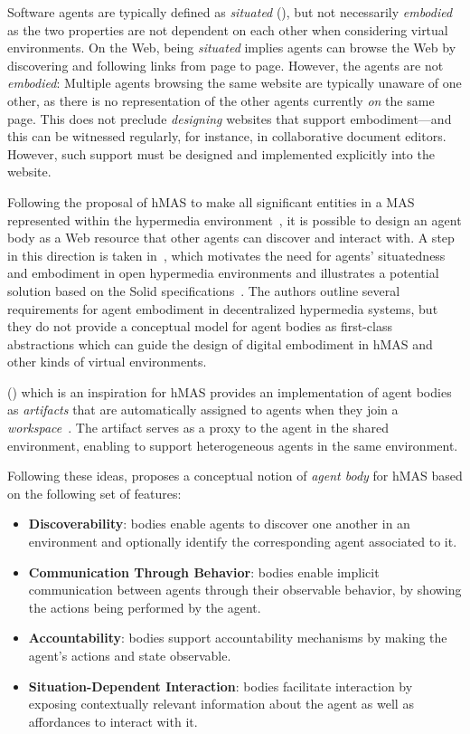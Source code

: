 Software agents are typically defined as \emph{situated} (), but not necessarily \emph{embodied} as the two properties are not dependent on each other when considering virtual environments.
%
On the Web, being \emph{situated} implies agents can browse the Web by discovering and following links from page to page. However, the agents are not \emph{embodied}: Multiple agents browsing the same website are typically unaware of one other, as there is no representation of the other agents currently \emph{on} the same page.
%
This does not preclude \textit{designing} websites that support embodiment---and this can be witnessed regularly, for instance, in collaborative document editors. However, such support must be designed and implemented explicitly into the website.

Following the proposal of \ac{hMAS} to make all significant entities in a \ac{MAS} represented within the hypermedia environment~\cite{Ciortea_Boissier_Ricci_2019}, it is possible to design an agent body as a Web resource that other agents can discover and interact with. 
%
A step in this direction is taken in~\cite{Zimmermann2023}, which motivates the need for agents' situatedness and embodiment in open hypermedia environments and illustrates a potential solution based on the Solid specifications~\cite{Solid_0.9.0:21}. The authors outline several requirements for agent embodiment in decentralized hypermedia systems, but they do not provide a conceptual model for agent bodies as first-class abstractions which can guide the design of digital embodiment in \ac{hMAS} and other kinds of virtual environments.

\cartago{} () which is an inspiration for \ac{hMAS} provides an implementation of agent bodies as \emph{artifacts} that are automatically assigned to agents when they join a \emph{workspace}~\cite{Ricci_Piunti_Viroli_Omicini_2009}.
%
The artifact serves as a proxy to the agent in the shared environment, enabling \cartago{} to support heterogeneous agents in the same environment.

Following these ideas, \cite{embodiment2025} proposes a conceptual notion of \emph{agent body} for \ac{hMAS} based on the following set of features:
\begin{itemize}
    \item \textbf{Discoverability}: bodies enable agents to discover one another in an environment and optionally identify the corresponding agent associated to it. 
    \item \textbf{Communication Through Behavior}: bodies enable implicit communication between agents through their observable behavior, by showing the actions being performed by the agent.
    \item \textbf{Accountability}: bodies support accountability mechanisms by making the agent's actions and state observable.
    \item \textbf{Situation-Dependent Interaction}: bodies facilitate interaction by exposing contextually relevant information about the agent as well as affordances to interact with it.
\end{itemize}

